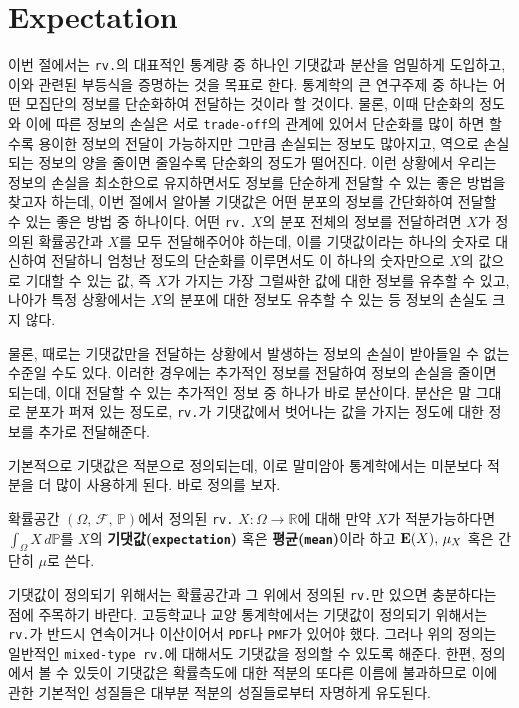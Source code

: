 \section{Expectation}

이번 절에서는 \texttt{rv.}의 대표적인 통계량 중 하나인 기댓값과 분산을 엄밀하게 도입하고, 이와 관련된 부등식을 증명하는 것을 목표로 한다. 통계학의 큰 연구주제 중 하나는 어떤 모집단의 정보를 단순화하여 전달하는 것이라 할 것이다. 물론, 이때 단순화의 정도와 이에 따른 정보의 손실은 서로 \texttt{trade-off}의 관계에 있어서 단순화를 많이 하면 할수록 용이한 정보의 전달이 가능하지만 그만큼 손실되는 정보도 많아지고, 역으로 손실되는 정보의 양을 줄이면 줄일수록 단순화의 정도가 떨어진다. 이런 상황에서 우리는 정보의 손실을 최소한으로 유지하면서도 정보를 단순하게 전달할 수 있는 좋은 방법을 찾고자 하는데, 이번 절에서 알아볼 기댓값은 어떤 분포의 정보를 간단화하여 전달할 수 있는 좋은 방법 중 하나이다. 어떤 \texttt{rv.} $X$의 분포 전체의 정보를 전달하려면 $X$가 정의된 확률공간과 $X$를 모두 전달해주어야 하는데, 이를 기댓값이라는 하나의 숫자로 대신하여 전달하니 엄청난 정도의 단순화를 이루면서도 이 하나의 숫자만으로 $X$의 값으로 기대할 수 있는 값, 즉 $X$가 가지는 가장 그럴싸한 값에 대한 정보를 유추할 수 있고, 나아가 특정 상황에서는 $X$의 분포에 대한 정보도 유추할 수 있는 등 정보의 손실도 크지 않다.

물론, 때로는 기댓값만을 전달하는 상황에서 발생하는 정보의 손실이 받아들일 수 없는 수준일 수도 있다. 이러한 경우에는 추가적인 정보를 전달하여 정보의 손실을 줄이면 되는데, 이대 전달할 수 있는 추가적인 정보 중 하나가 바로 분산이다. 분산은 말 그대로 분포가 퍼져 있는 정도로, \texttt{rv.}가 기댓값에서 벗어나는 값을 가지는 정도에 대한 정보를 추가로 전달해준다.

기본적으로 기댓값은 적분으로 정의되는데, 이로 말미암아 통계학에서는 미분보다 적분을 더 많이 사용하게 된다. 바로 정의를 보자.

\begin{definition}
    확률공간 $(\Omega,\,\mathcal{F},\,\mathbb{P})$에서 정의된 \texttt{rv.} $X:\Omega\to\mathbb{R}$에 대해 만약 $X$가 적분가능하다면 $\int_\Omega X\,d\mathbb{P}$를 $X$의 \textbf{기댓값(\texttt{expectation})} 혹은 \textbf{평균(\texttt{mean})}이라 하고 $\mathbf{E}(X),\,\mu_X$ 혹은 간단히 $\mu$로 쓴다.
\end{definition}

기댓값이 정의되기 위해서는 확률공간과 그 위에서 정의된 \texttt{rv.}만 있으면 충분하다는 점에 주목하기 바란다. 고등학교나 교양 통계학에서는 기댓값이 정의되기 위해서는 \texttt{rv.}가 반드시 연속이거나 이산이어서 \texttt{PDF}나 \texttt{PMF}가 있어야 했다. 그러나 위의 정의는 일반적인 \texttt{mixed-type rv.}에 대해서도 기댓값을 정의할 수 있도록 해준다.  한편, 정의에서 볼 수 있듯이 기댓값은 확률측도에 대한 적분의 또다른 이름에 불과하므로 이에 관한 기본적인 성질들은 대부분 적분의 성질들로부터 자명하게 유도된다.

